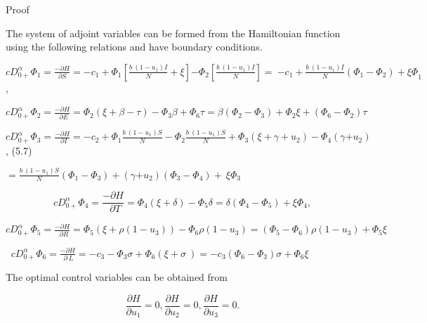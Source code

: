 \documentclass[10pt]{NSP1}
\numberwithin{equation}{section}
\begin{document}
Proof

The system of adjoint variables can be formed from the Hamiltonian function using the following relations and have boundary conditions.

${cD}_{0 +}^{\alpha}\Phi_{1} = \frac{- \partial H}{\partial S} = {- c}_{1} + \Phi_{1}\left\lbrack \frac{b\ \left( 1 - u_{1} \right)I}{N} + \xi \right\rbrack{- \Phi}_{2}\left\lbrack \frac{b\ \left( 1 - u_{1} \right)I}{N} \right\rbrack = \ {- c}_{1} + \frac{b\ \left( 1 - u_{1} \right)I}{N}\left( \Phi_{1} - \Phi_{2} \right) + {\xi\Phi}_{1}$,

${cD}_{0 +}^{\alpha}\Phi_{2} = \frac{- \partial H}{\ \ \partial E} = \Phi_{2}(\xi + \beta - \tau) - \Phi_{3}\beta + \Phi_{6}\tau = \beta\left( \Phi_{2} - \Phi_{3} \right) + \Phi_{2}\xi + (\Phi_{6} - \Phi_{2})\tau$

${cD}_{0 +}^{\alpha}\Phi_{3} = \frac{- \partial H}{\ \ \partial I} = - c_{2} + \Phi_{1}\frac{b\ \left( 1 - u_{1} \right)S}{N} - \Phi_{2}\frac{b\ \left( 1 - u_{1} \right)S}{N} + \Phi_{3}\left( \xi + \gamma + u_{2} \right) - \Phi_{4}(\gamma{+ u}_{2})$, (5.7)

$= \frac{b\ \left( 1 - u_{1} \right)S}{N}\left( \Phi_{1} - \Phi_{3} \right) + (\gamma{+ u}_{2})\left( \Phi_{3} - \Phi_{4} \right) + \ \xi\Phi_{3}\ $

\begin{equation}
{cD}_{0 +}^{\alpha}\Phi_{4} = \frac{- \partial H}{\ \ \partial T} = \Phi_{4}(\xi + \delta) - \Phi_{5}\delta = \delta\left( \Phi_{4} - \Phi_{5} \right) + \xi\Phi_{4},

\end{equation}

${cD}_{0 +}^{\alpha}\Phi_{5} = \frac{- \partial H}{\ \ \partial R} = \Phi_{5}\left( \xi + \rho\left( 1 - u_{3} \right) \right) - \Phi_{6}\rho\left( 1 - u_{3} \right) = \left( \Phi_{5} - \Phi_{6} \right)\rho\left( 1 - u_{3} \right) + \Phi_{5}\xi$

$\ $ ${cD}_{0 +}^{\alpha}\Phi_{6} = \frac{- \partial H}{\ \ \partial\ L\ } = - c_{3} - \Phi_{3}\sigma + \Phi_{6}(\xi + \sigma\ ) = - c_{3}\left( \Phi_{6} - \Phi_{3} \right)\sigma + \Phi_{6}\xi$

The optimal control variables can be obtained from

\begin{equation}
\frac{\partial H}{\partial u_{1}} = 0,\frac{\partial H}{\partial u_{2}} = 0,\frac{\partial H}{\partial u_{3}} = 0.

\end{equation}
\end{document}
